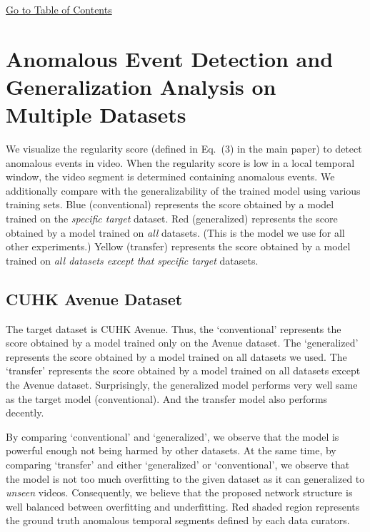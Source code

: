 \documentclass[10pt,twocolumn,letterpaper]{article}
\begin{document}
\begin{center}
	\hyperlink{page.11}{Go to Table of Contents}
\end{center}

\clearpage 

\section{Anomalous Event Detection and Generalization Analysis on Multiple Datasets}
\label{sec:anomaly}
We visualize the regularity score (defined in Eq.~(3) in the main paper) to detect anomalous events in video.
When the regularity score is low in a local temporal window, the video segment is determined containing anomalous events.
We additionally compare with the generalizability of the trained model using various training sets.
Blue (conventional) represents the score obtained by a model trained on the \emph{specific target} dataset.
Red (generalized) represents the score obtained by a model trained on \emph{all} datasets. (This is the model we use for all other experiments.)
Yellow (transfer) represents the score obtained by a model trained on \emph{all datasets except that specific target} datasets.

\subsection{CUHK Avenue Dataset}
\label{sec:anomaly_avenue}
The target dataset is CUHK Avenue.
Thus, the `conventional' represents the score obtained by a model trained only on the Avenue dataset.
The `generalized' represents the score obtained by a model trained on all datasets we used.
The `transfer' represents the score obtained by a model trained on all datasets except the Avenue dataset.
Surprisingly, the generalized model performs very well same as the target model (conventional).
And the transfer model also performs decently.

By comparing `conventional' and `generalized', we observe that the model is powerful enough not being harmed by other datasets.
At the same time, by comparing `transfer' and either `generalized' or `conventional', we observe that the model is not too much overfitting to the given dataset as it can generalized to \emph{unseen} videos.
Consequently, we believe that the proposed network structure is well balanced between overfitting and underfitting.
Red shaded region represents the ground truth anomalous temporal segments defined by each data curators.
\end{document}
